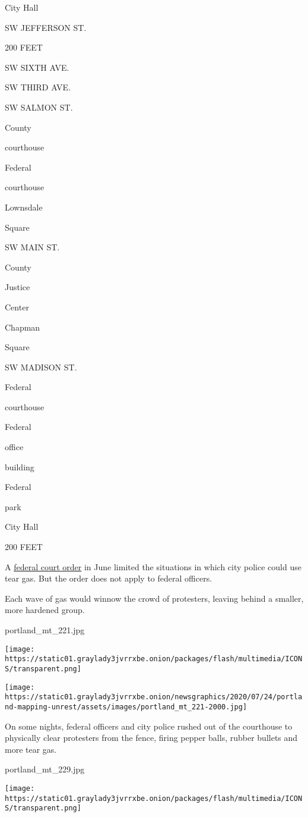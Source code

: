 City Hall

SW JEFFERSON ST.

200 FEET

SW SIXTH AVE.

SW THIRD AVE.

SW SALMON ST.

County

courthouse

Federal

courthouse

Lownsdale

Square

SW MAIN ST.

County

Justice

Center

Chapman

Square

SW MADISON ST.

Federal

courthouse

Federal

office

building

Federal

park

City Hall

200 FEET

A
\href{https://drive.google.com/file/d/1ffmJ7_h_nGEERZUaUe2LhjALyCEbrNBQ/view}{federal
court order} in June limited the situations in which city police could
use tear gas. But the order does not apply to federal officers.

Each wave of gas would winnow the crowd of protesters, leaving behind a
smaller, more hardened group.

portland\_mt\_221.jpg

\texttt{[image: https://static01.graylady3jvrrxbe.onion/packages/flash/multimedia/ICONS/transparent.png]}

\texttt{[image: https://static01.graylady3jvrrxbe.onion/newsgraphics/2020/07/24/portland-mapping-unrest/assets/images/portland\_mt\_221-2000.jpg]}

On some nights, federal officers and city police rushed out of the
courthouse to physically clear protesters from the fence, firing pepper
balls, rubber bullets and more tear gas.

portland\_mt\_229.jpg

\texttt{[image: https://static01.graylady3jvrrxbe.onion/packages/flash/multimedia/ICONS/transparent.png]}

